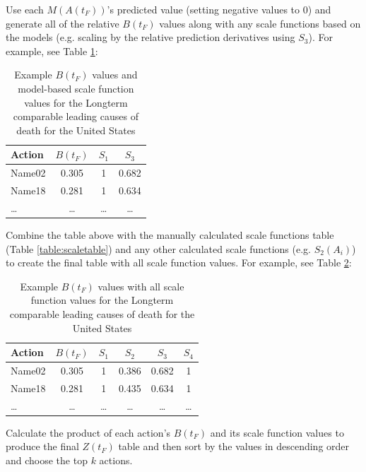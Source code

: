 \documentclass[10pt, a4paper, twocolumn]{IEEEconf}
\begin{document}
Use each $M(A(t_F))$'s predicted value (setting negative values to 0) and generate all of the relative $B(t_F)$ values along with any scale functions based on the models (e.g. scaling by the relative prediction derivatives using $S_3$).
For example, see Table \ref{table:btable}:

\begin{table}[H]
  \centering
  \begin{tabular}{lccc}
    \toprule
      Action  & $B(t_F)$ & $S_1$  & $S_3$  \\
    \midrule
      Name02  & 0.305    & 1      & 0.682  \\
      Name18  & 0.281    & 1      & 0.634  \\
      \ldots  & \ldots   & \ldots & \ldots \\
    \bottomrule
  \end{tabular}
  \caption{Example $B(t_F)$ values and model-based scale function values for the Longterm comparable leading causes of death for the United States}
  \label{table:btable}
\end{table}

Combine the table above with the manually calculated scale functions table (Table \ref{table:scaletable}) and any other calculated scale functions (e.g. $S_2(A_i)$) to create the final table with all scale function values.
For example, see Table \ref{table:btablewithall}:

\begin{table}[H]
  \centering
  \begin{tabular}{lccccc}
    \toprule
      Action  & $B(t_F)$ & $S_1$  & $S_2$  & $S_3$  & $S_4$  \\
    \midrule
      Name02  & 0.305    & 1      & 0.386  & 0.682  & 1      \\
      Name18  & 0.281    & 1      & 0.435  & 0.634  & 1      \\
      \ldots  & \ldots   & \ldots & \ldots & \ldots & \ldots \\
    \bottomrule
  \end{tabular}
  \caption{Example $B(t_F)$ values with all scale function values for the Longterm comparable leading causes of death for the United States}
  \label{table:btablewithall}
\end{table}

Calculate the product of each action's $B(t_F)$ and its scale function values to produce the final $Z(t_F)$ table and then sort by the values in descending order and choose the top $k$ actions.
\end{document}
